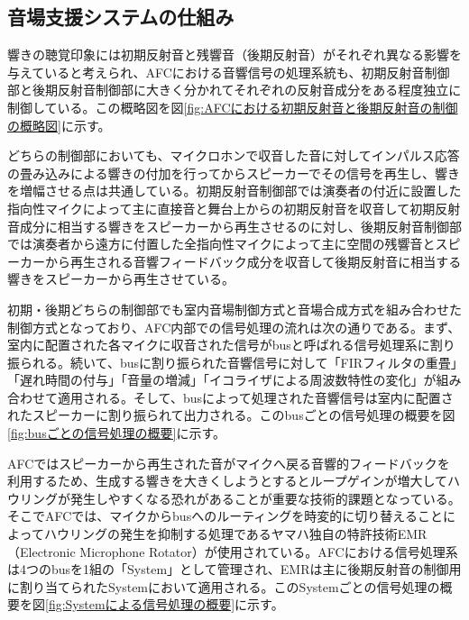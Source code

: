 \documentclass[11pt,a4j]{jreport}
\begin{document}
\subsection*{音場支援システムの仕組み}
響きの聴覚印象には初期反射音と残響音（後期反射音）がそれぞれ異なる影響を与えていると考えられ、AFCにおける音響信号の処理系統も、初期反射音制御部と後期反射音制御部に大きく分かれてそれぞれの反射音成分をある程度独立に制御している。この概略図を図\ref{fig:AFCにおける初期反射音と後期反射音の制御の概略図}に示す。

どちらの制御部においても、マイクロホンで収音した音に対してインパルス応答の畳み込みによる響きの付加を行ってからスピーカーでその信号を再生し、響きを増幅させる点は共通している。初期反射音制御部では演奏者の付近に設置した指向性マイクによって主に直接音と舞台上からの初期反射音を収音して初期反射音成分に相当する響きをスピーカーから再生させるのに対し、後期反射音制御部では演奏者から遠方に付置した全指向性マイクによって主に空間の残響音とスピーカーから再生される音響フィードバック成分を収音して後期反射音に相当する響きをスピーカーから再生させている。

初期・後期どちらの制御部でも室内音場制御方式と音場合成方式を組み合わせた制御方式となっており、AFC内部での信号処理の流れは次の通りである。まず、室内に配置された各マイクに収音された信号がbusと呼ばれる信号処理系に割り振られる。続いて、busに割り振られた音響信号に対して「FIRフィルタの重畳」「遅れ時間の付与」「音量の増減」「イコライザによる周波数特性の変化」が組み合わせて適用される。そして、busによって処理された音響信号は室内に配置されたスピーカーに割り振られて出力される。このbusごとの信号処理の概要を図\ref{fig:busごとの信号処理の概要}に示す。

AFCではスピーカーから再生された音がマイクへ戻る音響的フィードバックを利用するため、生成する響きを大きくしようとするとループゲインが増大してハウリングが発生しやすくなる恐れがあることが重要な技術的課題となっている。そこでAFCでは、マイクからbusへのルーティングを時変的に切り替えることによってハウリングの発生を抑制する処理であるヤマハ独自の特許技術EMR（Electronic Microphone Rotator）\cite{清水1996EMR}が使用されている。AFCにおける信号処理系は4つのbusを1組の「System」として管理され、EMRは主に後期反射音の制御用に割り当てられたSystemにおいて適用される。このSystemごとの信号処理の概要を図\ref{fig:Systemによる信号処理の概要}に示す。

\end{document}
